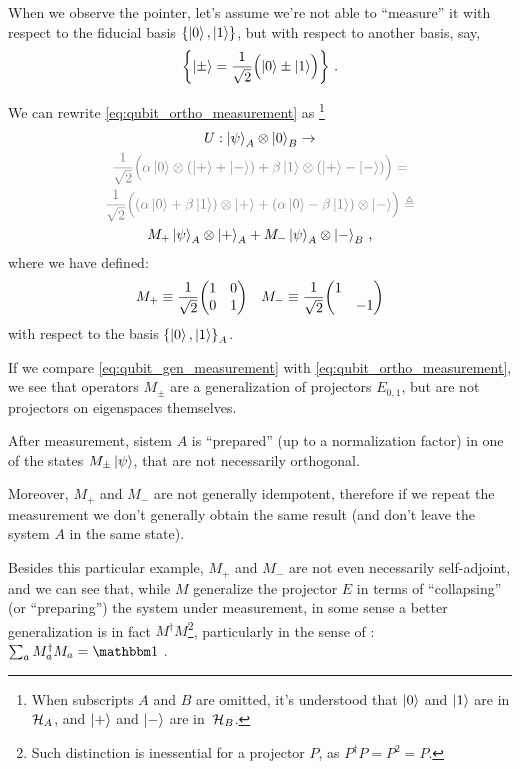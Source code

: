 When we observe the pointer, let's assume we're not
able to ``measure'' it with respect to the fiducial basis
$\left\{\ket{0}, \ket{1}\right\}$,
but with respect to another basis, say,
\begin{equation}\label{eq:pmbasis}
\left\{\ket{\pm} = \frac{1}{\sqrt{2}} \qty\Big(\ket{0} \pm \ket{1})\right\} \,\text{.}
\end{equation}

We can rewrite \eqref{eq:qubit_ortho_measurement} as
\footnote{
  When subscripts $A$ and $B$ are omitted, it's understood that
  $\ket{0}$ and $\ket{1}$ are in $\mathcal{H}_A$, and
  $\ket{+}$ and $\ket{-}$ are in~$\mathcal{H}_B$.
}
\begin{multline}\label{eq:qubit_gen_measurement}
  U: \ket{\psi}_A \ox \ket{0}_B                   \rightarrow \\
  \color{gray}
  \frac{1}{\sqrt{2}} \qty\Big(
    \alpha\ket{0} \ox \qty(\ket{+}+\ket{-}) +
    \beta \ket{1} \ox \qty(\ket{+}-\ket{-})
  )                                               =           \\
  \color{gray}
  \frac{1}{\sqrt{2}} \qty\Big(
    \qty(\alpha\ket{0} + \beta\ket{1}) \ox \ket{+} +
    \qty(\alpha\ket{0} - \beta\ket{1}) \ox \ket{-}
  )                                               \eqdef      \\
  M_+\ket{\psi}_A \ox \ket{+}_A + M_-\ket{\psi}_A \ox \ket{-}_B
  \,\text{,}
\end{multline}
where we have defined:
\begin{align*}
  &
  M_+ \repr \frac{1}{\sqrt{2}}\mqty(\imat{2})
  &
  M_- \repr \frac{1}{\sqrt{2}}\mqty(\dmat{1, -1})
\end{align*}
with respect to the basis $\left\{\ket{0}, \ket{1}\right\}_A$.

If we compare \eqref{eq:qubit_gen_measurement}
with \eqref{eq:qubit_ortho_measurement},
we see that operators $M_{\pm}$
are a generalization of projectors $E_{0,1}$,
but are not projectors on eigenspaces themselves.

After measurement, sistem $A$ is ``prepared''
(up to a normalization factor)
in one of the states $M_{\pm}\ket{\psi}$,
that are not necessarily orthogonal.

Moreover, $M_+$ and $M_-$ are not generally idempotent,
therefore if we repeat the measurement we don't generally
obtain the same result (and don't leave the system $A$ in the same state).

Besides this particular example, $M_+$ and $M_-$ are not even necessarily
self-adjoint, and we can see that, while $M$ generalize the projector $E$
in terms of ``collapsing'' (or ``preparing'') the system under measurement,
in some sense a better generalization is in fact $M^{\dagger}M$\footnote{
  Such distinction is inessential for a projector $P$,
  as $P^{\dagger}P = P^2 = P$.
}, particularly in the sense of :
$\sum_a M_a^{\dagger}M_a = \idop$ \parencite[Sec. 3.1]{PreskillNotes}.

